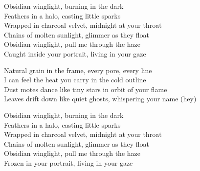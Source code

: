 \begin{lyrics}
Obsidian winglight, burning in the dark\\
Feathers in a halo, casting little sparks\\
Wrapped in charcoal velvet, midnight at your throat\\
Chains of molten sunlight, glimmer as they float\\
Obsidian winglight, pull me through the haze\\
Caught inside your portrait, living in your gaze

Natural grain in the frame, every pore, every line\\
I can feel the heat you carry in the cold outline\\
Dust motes dance like tiny stars in orbit of your flame\\
Leaves drift down like quiet ghosts, whispering your name (hey)

Obsidian winglight, burning in the dark\\
Feathers in a halo, casting little sparks\\
Wrapped in charcoal velvet, midnight at your throat\\
Chains of molten sunlight, glimmer as they float\\
Obsidian winglight, pull me through the haze\\
Frozen in your portrait, living in your gaze
\end{lyrics}

